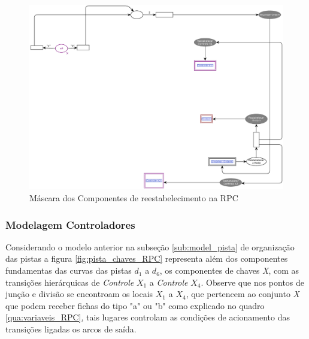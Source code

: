 \begin{figure}[ht]
    \centering
    \caption{Máscara dos Componentes de reestabelecimento na RPC}
    \label{fig:restabelecer_geral}
    \includegraphics[width=1\linewidth]{figures/Simulation/Modelagem/restabelecer_geral.eps}
\end{figure}

\clearpage
\subsubsection{Modelagem Controladores}
Considerando o modelo anterior na subseção \ref{sub:model_pista} de organização das pistas a figura \ref{fig:pista_chaves_RPC} representa além dos componentes fundamentas das curvas das pistas $d_1$ a $d_6$, os componentes de chaves \textit{X}, com as transições hierárquicas de \textit{Controle} $X_1$ a \textit{Controle} $X_4$. Observe que nos pontos de junção e divisão se encontroam os locais $X_1$ a $X_4$, que pertencem ao conjunto \textit{X} que podem receber fichas do tipo "a" ou "b" como explicado no quadro \ref{qua:variaveis_RPC}, tais lugares controlam as condições de acionamento das transições ligadas os arcos de saída. 

